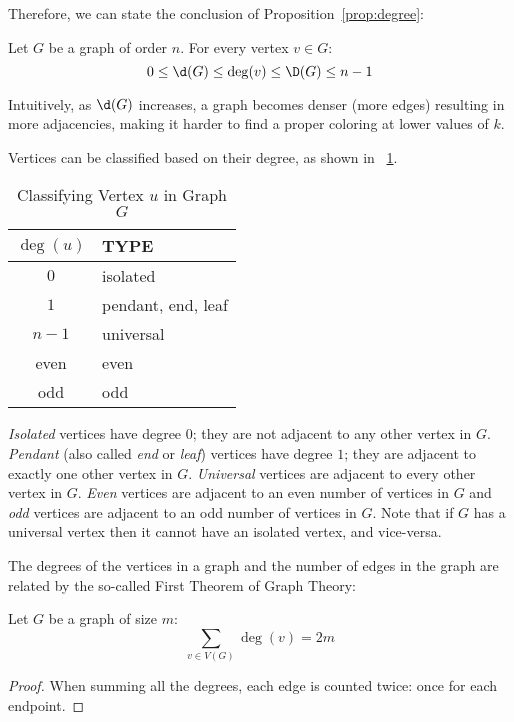 Therefore, we can state the conclusion of Proposition~\ref{prop:degree}:

\begin{proposition}
  \label{prop:degree}
  Let \(G\) be a graph of order \(n\).  For every vertex \(v\in G\):
\[0\le\d(G)\le\deg(v)\le\D(G)\le n-1\]
\end{proposition}

Intuitively, as \(\d(G)\) increases, a graph becomes denser (more edges) resulting in more adjacencies, making it
harder to find a proper coloring at lower values of \(k\).

Vertices can be classified based on their degree, as shown in \tablename~\ref{tab:degree}.

\begin{table}[H]
  \centering
  \caption{Classifying Vertex \(u\) in Graph \(G\)}
  \label{tab:degree}
  \begin{tabular}{|c|l|}
    \hline
    \(\deg(u)\) & TYPE \\
    \hline
    \(0\) & isolated \\
    \(1\) & pendant, end, leaf \\
    \(n-1\) & universal \\
    even & even \\
    odd & odd \\
    \hline
  \end{tabular}
\end{table}

\emph{Isolated} vertices have degree \(0\); they are not adjacent to any other vertex in \(G\).  \emph{Pendant}
(also called \emph{end} or \emph{leaf}) vertices have degree \(1\); they are adjacent to exactly one other vertex
in \(G\).  \emph{Universal} vertices are adjacent to every other vertex in \(G\).  \emph{Even} vertices are adjacent
to an even number of vertices in \(G\) and \emph{odd} vertices are adjacent to an odd number of vertices in \(G\).
Note that if \(G\) has a universal vertex then it cannot have an isolated vertex, and vice-versa.

The degrees of the vertices in a graph and the number of edges in the graph are related by the so-called First
Theorem of Graph Theory:

\begin{theorem}
  \label{thm:first}
  Let \(G\) be a graph of size \(m\):
  \[\sum_{v\in V(G)}\deg(v)=2m\]
\end{theorem}

\begin{proof}
  When summing all the degrees, each edge is counted twice: once for each endpoint.
\end{proof}

